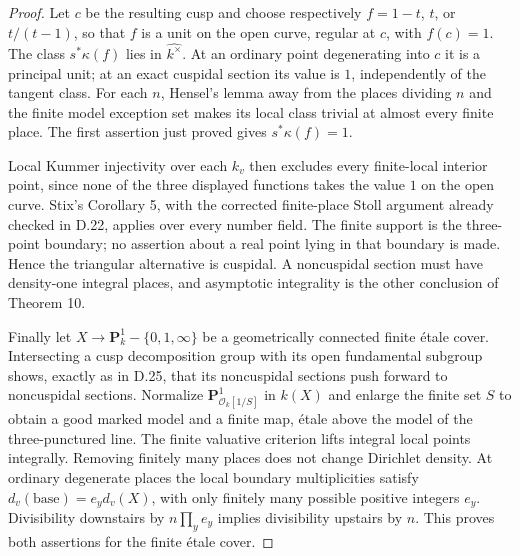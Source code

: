 \begin{proof}
Let $c$ be the resulting cusp and choose respectively
$f=1-t$, $t$, or $t/(t-1)$, so that $f$ is a unit on the
open curve, regular at $c$, with $f(c)=1$.
The class $s^*\kappa(f)$ lies in $\widehat{k^\times}$.
At an ordinary point degenerating into $c$ it is a principal
unit; at an exact cuspidal section its value is $1$,
independently of the tangent class. For each $n$, Hensel's
lemma away from the places dividing $n$ and the finite
model exception set makes its local class trivial at
almost every finite place. The first assertion just proved
gives $s^*\kappa(f)=1$.

Local Kummer injectivity over each $k_v$ then excludes every
finite-local interior point, since none of the three displayed
functions takes the value $1$ on the open curve. Stix's
Corollary 5, with the corrected finite-place Stoll argument
already checked in D.22, applies over every number field.
The finite support is the three-point boundary; no assertion
about a real point lying in that boundary is made. Hence the
triangular alternative is cuspidal. A noncuspidal section
must have density-one integral places, and asymptotic
integrality is the other conclusion of Theorem 10.

Finally let $X\to\mathbf P^1_k-\{0,1,\infty\}$ be a
geometrically connected finite \'etale cover. Intersecting a
cusp decomposition group with its open fundamental subgroup
shows, exactly as in D.25, that its noncuspidal sections
push forward to noncuspidal sections. Normalize
$\mathbf P^1_{\mathcal O_k[1/S]}$ in $k(X)$ and enlarge the
finite set $S$ to obtain a good marked model and a finite
map, \'etale above the model of the three-punctured line.
The finite valuative criterion lifts integral local points
integrally. Removing finitely many places does not change
Dirichlet density. At ordinary degenerate places the local
boundary multiplicities satisfy
$d_v(\text{base})=e_y d_v(X)$, with only finitely many
possible positive integers $e_y$. Divisibility downstairs
by $n\prod_y e_y$ implies divisibility upstairs by $n$.
This proves both assertions for the finite \'etale cover.
\end{proof}
